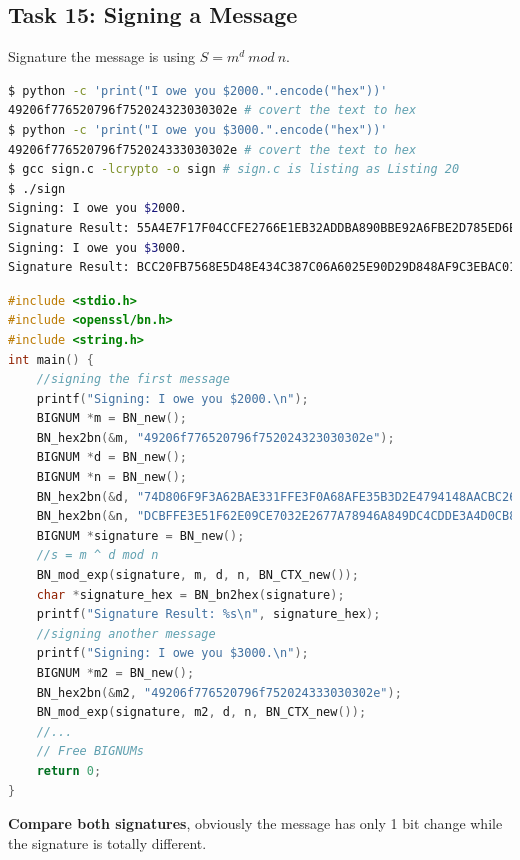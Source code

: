 \documentclass[a4paper,11pt]{article}
\begin{document}
\subsection{Task 15: Signing a Message}
Signature the message is using $S = m^d\ mod\ n$.
\begin{lstlisting}[caption={Result of the Task 15},label={lst:task15},language=BASH,breaklines=true]
$ python -c 'print("I owe you $2000.".encode("hex"))'
49206f776520796f752024323030302e # covert the text to hex
$ python -c 'print("I owe you $3000.".encode("hex"))'
49206f776520796f752024333030302e # covert the text to hex
$ gcc sign.c -lcrypto -o sign # sign.c is listing as Listing 20
$ ./sign
Signing: I owe you $2000.
Signature Result: 55A4E7F17F04CCFE2766E1EB32ADDBA890BBE92A6FBE2D785ED6E73CCB35E4CB
Signing: I owe you $3000.
Signature Result: BCC20FB7568E5D48E434C387C06A6025E90D29D848AF9C3EBAC0135D99305822
\end{lstlisting} 
\begin{lstlisting}[caption={C Program Code for Signature},label={lst:task4.15-2},language=C,breaklines=true]
#include <stdio.h>
#include <openssl/bn.h>
#include <string.h>
int main() {
    //signing the first message
    printf("Signing: I owe you $2000.\n");
    BIGNUM *m = BN_new();
    BN_hex2bn(&m, "49206f776520796f752024323030302e");
    BIGNUM *d = BN_new();
    BIGNUM *n = BN_new();
    BN_hex2bn(&d, "74D806F9F3A62BAE331FFE3F0A68AFE35B3D2E4794148AACBC26AA381CD7D30D");
    BN_hex2bn(&n, "DCBFFE3E51F62E09CE7032E2677A78946A849DC4CDDE3A4D0CB81629242FB1A5");
    BIGNUM *signature = BN_new();
    //s = m ^ d mod n
    BN_mod_exp(signature, m, d, n, BN_CTX_new());
    char *signature_hex = BN_bn2hex(signature);
    printf("Signature Result: %s\n", signature_hex);
    //signing another message
    printf("Signing: I owe you $3000.\n");
    BIGNUM *m2 = BN_new();
    BN_hex2bn(&m2, "49206f776520796f752024333030302e");
    BN_mod_exp(signature, m2, d, n, BN_CTX_new());
    //...
    // Free BIGNUMs
    return 0;
}
\end{lstlisting} 
\textbf{Compare both signatures}, obviously the message has only 1 bit change while the signature is totally different.
\end{document}
